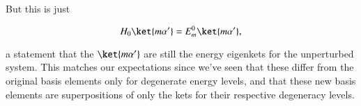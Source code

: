 But this is just

\begin{equation}\label{eqn:pertubationDegeneracy:490}
H_0 \ket{m \alpha'} = E_m^0 \ket{m \alpha'},
\end{equation}

a statement that the $\ket{m \alpha'}$ are still the energy eigenkets for the unperturbed system.  This matches our expectations since we've seen that these differ from the original basis elements only for degenerate energy levels, and that these new basis elements are superpositions of only the kets for their respective degeneracy levels.

%
\EndArticle
